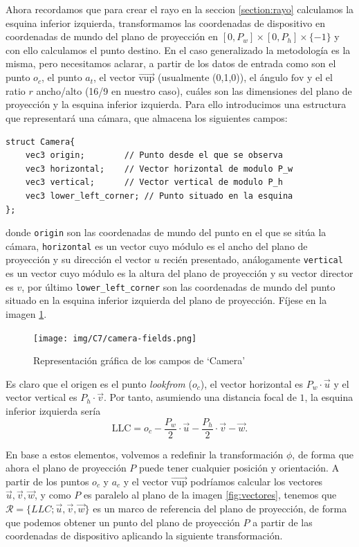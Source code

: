 Ahora recordamos que para crear el rayo en la seccion \ref{section:rayo} calculamos la esquina inferior izquierda, transformamos las coordenadas de dispositivo en coordenadas de mundo del plano de proyección en $[0,P_w]\times[0,P_h]\times\{-1\}$ y con ello calculamos el punto destino. En el caso generalizado la metodología es la misma, pero necesitamos aclarar, a partir de los datos de entrada como son el punto $o_c$, el punto $a_t$, el vector $\overrightarrow{\mathrm{vup}}$ (usualmente (0,1,0)), el ángulo $\widehat{\mathrm{fov}}$ y el el ratio $r$ ancho/alto (16/9 en nuestro caso), cuáles son las dimensiones del plano de proyección y la esquina inferior izquierda. Para ello introducimos una estructura que representará una cámara, que almacena los siguientes campos:

\begin{lstlisting}
struct Camera{
    vec3 origin;        // Punto desde el que se observa
    vec3 horizontal;    // Vector horizontal de modulo P_w
    vec3 vertical;      // Vector vertical de modulo P_h
    vec3 lower_left_corner; // Punto situado en la esquina
};
\end{lstlisting}
donde \verb|origin| son las coordenadas de mundo del punto en el que se sitúa la cámara, \verb|horizontal| es un vector cuyo módulo es el ancho del plano de proyección y su dirección el vector $u$ recién presentado, análogamente \verb|vertical| es un vector cuyo módulo es la altura del plano de proyección y su vector director es $v$, por último \verb|lower_left_corner| son las coordenadas de mundo del punto situado en la esquina inferior izquierda del plano de proyección. Fíjese en la imagen \ref{fig:camera-fields}.

\begin{figure} [ht]
    \centering
    \texttt{[image: img/C7/camera-fields.png]}
    \caption{Representación gráfica de los campos de `Camera'}
    \label{fig:camera-fields}
\end{figure}


Es claro que el origen es el punto \textit{lookfrom} ($o_c$), el vector horizontal es $P_w\cdot \vec u$ y el vector vertical es $P_h\cdot \vec v$. Por tanto, asumiendo una distancia focal de $1$, la esquina inferior izquierda sería
$$
\mathrm{LLC} = o_c - \frac{P_w}{2}\cdot \vec u - \frac{P_h}{2}\cdot \vec v - \vec w.
$$

En base a estos elementos, volvemos a redefinir la transformación $\phi$, de forma que ahora el plano de proyección $P$ puede tener cualquier posición y orientación. A partir de los puntos $o_c$ y $a_c$ y el vector $\overrightarrow{\mathrm{vup}}$ podríamos calcular los vectores $\vec u, \vec v, \vec w$, y como $P$ es paralelo al plano de la imagen \ref{fig:vectores}, tenemos que $\mathcal{R}=\{LLC; \vec u, \vec v, \vec w \}$ es un marco de referencia del plano de proyección, de forma que podemos obtener un punto del plano de proyección $P$ a partir de las coordenadas de dispositivo aplicando la siguiente transformación.

